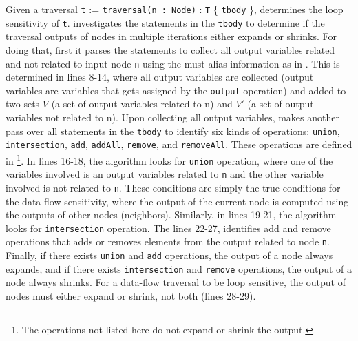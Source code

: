 Given a traversal \lstinline|t| := \lstinline|traversal(n : Node)| :
\lstinline|T| \{ \lstinline|tbody| \},  determines
the loop sensitivity of \lstinline|t|.
 investigates the statements in the
\lstinline|tbody| to determine if the traversal outputs of nodes in multiple
iterations either expands or shrinks. For doing that, first it parses the
statements to collect all output variables related and not related to input node
\lstinline|n| using the must alias information as in
. This is determined in lines 8-14, where all
output variables are collected (output variables are variables that gets
assigned by the \lstinline|output| operation) and added to two sets $V$ (a set
of output variables related to n) and $V'$ (a set of output variables not
related to n).
Upon collecting all output variables,  makes
another pass over all statements in the \lstinline|tbody| to identify six kinds
of operations: \lstinline|union|, \lstinline|intersection|, \lstinline|add|,
\lstinline|addAll|, \lstinline|remove|, and \lstinline|removeAll|. These
operations are defined in \footnote{The operations not
listed here do not expand or shrink the output.}.
In lines 16-18, the algorithm looks for \lstinline|union| operation, where one
of the variables involved is an output variables related to \lstinline|n| and
the other variable involved is not related to \lstinline|n|. These conditions
are simply the true conditions for the data-flow sensitivity, where the output
of the current node is computed using the outputs of other nodes (neighbors).
Similarly, in lines 19-21, the algorithm looks for \lstinline|intersection|
operation. The lines 22-27, identifies add and remove operations that adds or
removes elements from the output related to node \lstinline|n|. Finally, if
there exists \lstinline|union| and \lstinline|add| operations, the output of a
node always expands, and if there exists \lstinline|intersection| and
\lstinline|remove| operations, the output of a node always shrinks. For a
data-flow traversal to be loop sensitive, the output of nodes must either expand
or shrink, not both (lines 28-29). 

